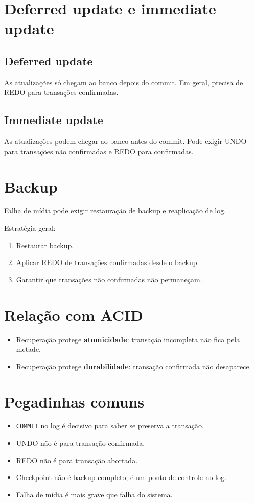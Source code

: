 \documentclass[12pt,a4paper]{article}
\begin{document}
\section{Deferred update e immediate update}
\subsection{Deferred update}
As atualizações só chegam ao banco depois do commit. Em geral, precisa de REDO para transações confirmadas.

\subsection{Immediate update}
As atualizações podem chegar ao banco antes do commit. Pode exigir UNDO para transações não confirmadas e REDO para confirmadas.

\section{Backup}
Falha de mídia pode exigir restauração de backup e reaplicação de log.

Estratégia geral:
\begin{enumerate}
    \item Restaurar backup.
    \item Aplicar REDO de transações confirmadas desde o backup.
    \item Garantir que transações não confirmadas não permaneçam.
\end{enumerate}

\section{Relação com ACID}
\begin{itemize}
    \item Recuperação protege \textbf{atomicidade}: transação incompleta não fica pela metade.
    \item Recuperação protege \textbf{durabilidade}: transação confirmada não desaparece.
\end{itemize}

\section{Pegadinhas comuns}
\begin{itemize}
    \item \texttt{COMMIT} no log é decisivo para saber se preserva a transação.
    \item UNDO não é para transação confirmada.
    \item REDO não é para transação abortada.
    \item Checkpoint não é backup completo; é um ponto de controle no log.
    \item Falha de mídia é mais grave que falha do sistema.
\end{itemize}
\end{document}
